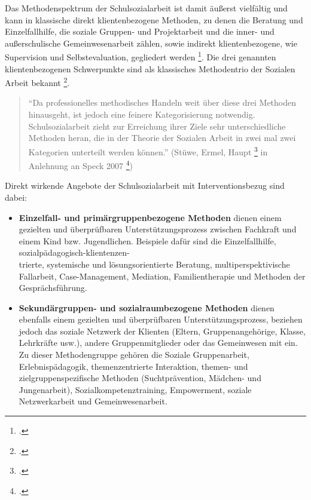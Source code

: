 Das Methodenspektrum der Schulsozialarbeit ist damit äußerst vielfältig und kann in klassische direkt klientenbezogene Methoden, zu denen die Beratung und Einzelfallhilfe, die soziale Gruppen- und Projektarbeit und die inner- und außerschulische Gemeinwesenarbeit zählen, sowie indirekt klientenbezogene, wie Supervision und Selbstevaluation, gegliedert werden \footcites[vgl.][22]{Kilb2009}[vgl.][64]{Speck2007}. Die drei genannten klientenbezogenen Schwerpunkte sind als klassisches Methodentrio der Sozialen Arbeit bekannt \footcite[vgl.][95]{Stuewe2015}. 

\begin{quotation}
\noindent
"`Da professionelles methodisches Handeln weit über diese drei Methoden hinausgeht, ist jedoch eine feinere Kategorisierung notwendig. Schulsozialarbeit zieht zur Erreichung ihrer Ziele sehr unterschiedliche Methoden heran, die in der Theorie der Sozialen Arbeit in zwei mal zwei Kategorien unterteilt werden können."' (Stüwe, Ermel, Haupt \footcite[vgl.][95]{Stuewe2015} in Anlehnung an Speck 2007 \footcite[vgl.][64f]{Speck2007})
\end{quotation}

Direkt wirkende Angebote der Schulsozialarbeit mit Interventionsbezug sind dabei:\\
\begin{itemize}
	\item \textbf{Einzelfall- und primärgruppenbezogene Methoden} dienen einem gezielten und überprüfbaren Unterstützungsprozess zwischen Fachkraft und einem Kind bzw. Jugendlichen. Beispiele dafür sind die Einzelfallhilfe, sozialpädagogisch-klientenzen-\\
	trierte, systemische und lösungsorientierte Beratung, multiperspektivische Fallarbeit, Case-Management, Mediation, Familientherapie und Methoden der Gesprächsführung. 
	\item \textbf{Sekundärgruppen- und sozialraumbezogene Methoden} dienen ebenfalls einem gezielten und überprüfbaren Unterstützungsprozess, beziehen jedoch das soziale Netzwerk der Klienten (Eltern, Gruppenangehörige, Klasse, Lehrkräfte usw.), andere Gruppenmitglieder oder das Gemeinwesen mit ein. Zu dieser Methodengruppe gehören die Soziale Gruppenarbeit, Erlebnispädagogik, themenzentrierte Interaktion, themen- und zielgruppenspezifische Methoden (Suchtprävention, Mädchen- und Jungenarbeit), Sozialkompetenztraining, Empowerment, soziale Netzwerkarbeit und Gemeinwesenarbeit. 
\end{itemize}

